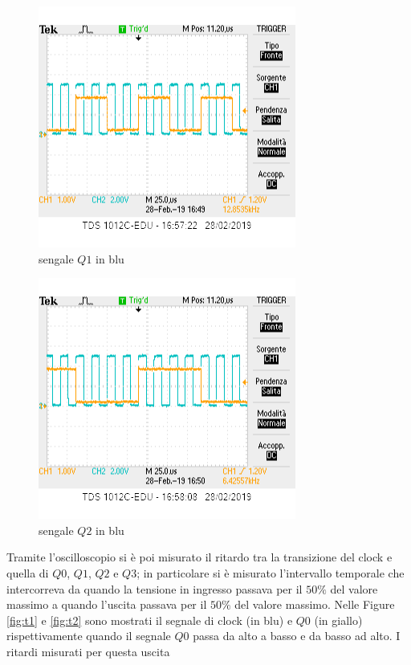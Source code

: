 \documentclass[10pt,a4paper]{article}
\begin{document}
\begin{figure}[h]

			\centering

			\includegraphics[scale=0.85]{1quarto}

			\caption{sengale $Q1$ in blu}

			\label{fig:plh}

\end{figure}

\begin{figure}[h]

			\centering

			\includegraphics[scale=0.85]{1ottavo}

			\caption{sengale $Q2$ in blu}

			\label{fig:plh}

\end{figure}

Tramite l'oscilloscopio si è poi misurato il ritardo tra la transizione del clock e quella di $Q0$, $Q1$, $Q2$ e $Q3$; in particolare si è misurato l'intervallo temporale che intercorreva da quando la tensione in ingresso passava per il $50\%$ del valore massimo a quando l'uscita passava per  il $50\%$ del valore massimo. Nelle Figure \ref{fig:t1} e \ref{fig:t2} sono mostrati il segnale di clock (in blu) e $Q0$ (in giallo) rispettivamente quando il segnale  $Q0$ passa da alto a basso e da basso ad alto. I ritardi misurati per questa uscita 
\end{document}
